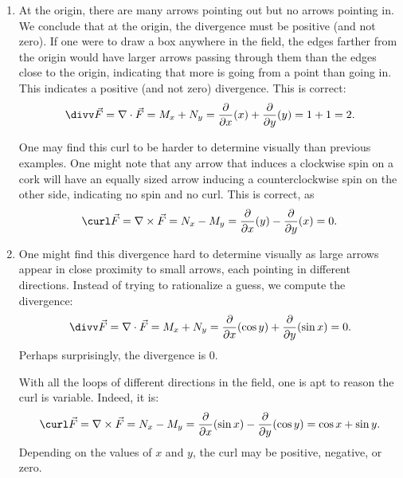 \begin{example}
\begin{enumerate}
		\item At the origin, there are many arrows pointing out but no arrows pointing in. We conclude that at the origin, the divergence must be positive (and not zero). If one were to draw a box anywhere in the field, the edges farther from the origin would have larger arrows passing through them than the edges close to the origin, indicating that more is going from a point than going in. This indicates a positive (and not zero) divergence. This is correct:
	\[
	\divv\vec F = \nabla \cdot \vec F
	= M_x + N_y = \frac{\partial}{\partial x}(x) + \frac{\partial}{\partial y}(y)
	= 1+1=2.
	\]
	
	One may find this curl to be harder to determine visually than previous examples. One might note that any arrow that induces a clockwise spin on a cork will have an equally sized arrow inducing a counterclockwise spin on the other side, indicating no spin and no curl. This is correct, as
	\[
	\curl \vec F = \nabla\times\vec F
	= N_x-M_y = \frac{\partial}{\partial x}(y) - \frac{\partial}{\partial y}(x) = 0.
	\]
	
	\item	One might find this divergence hard to determine visually as large arrows appear in close proximity to small arrows, each pointing in different directions. Instead of trying to rationalize a guess, we compute the divergence:
	\[
	\divv\vec F = \nabla \cdot \vec F = M_x + N_y
	= \frac{\partial}{\partial x}(\cos y) + \frac{\partial}{\partial y}(\sin x) = 0.
	\] 
	Perhaps surprisingly, the divergence is 0.
	
	With all the loops of different directions in the field, one is apt to reason the curl is variable. Indeed, it is:
	\[
	\curl \vec F = \nabla\times\vec F = N_x-M_y
	= \frac{\partial}{\partial x}(\sin x) - \frac{\partial}{\partial y}(\cos y)
	= \cos x + \sin y.
	\]
	Depending on the values of $x$ and $y$, the curl may be positive, negative, or zero.
\end{enumerate}
\end{example}

